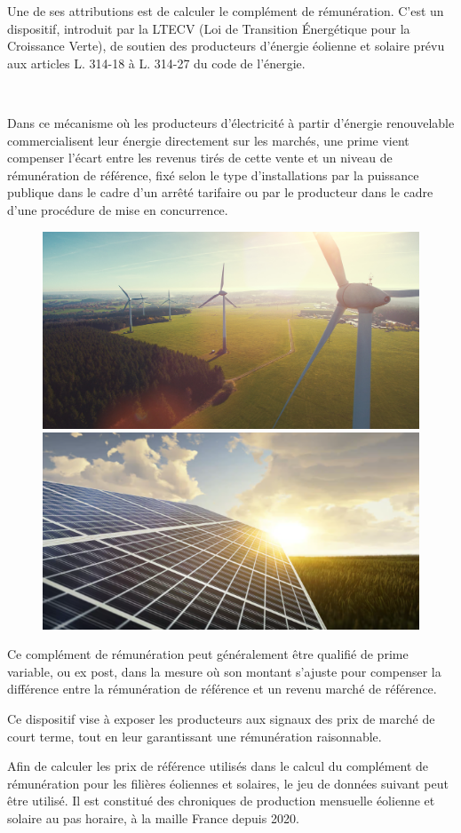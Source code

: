 Une de ses attributions est de calculer le complément de rémunération. C'est un dispositif, introduit par la LTECV (Loi de Transition Énergétique pour la Croissance Verte), de soutien des producteurs d’énergie éolienne et solaire prévu aux articles L. 314-18 à L. 314-27 du code de l’énergie.

~\

Dans ce mécanisme où les producteurs d’électricité à partir d’énergie renouvelable commercialisent leur énergie directement sur les marchés, une prime vient compenser l’écart entre les revenus tirés de cette vente et un niveau de rémunération de référence, fixé selon le type d’installations par la puissance publique dans le cadre d’un arrêté tarifaire ou par le producteur dans le cadre d’une procédure de mise en concurrence.

\begin{figure}[!ht]
\centering
\includegraphics[width=0.45\linewidth]{img/eolienne}\hfill
\includegraphics[width=0.45\linewidth]{img/solaire}
\end{figure}
Ce complément de rémunération peut généralement être qualifié de prime variable, ou ex post, dans la mesure où son montant s’ajuste pour compenser la différence entre la rémunération de référence et un revenu marché de référence.

Ce dispositif vise à exposer les producteurs aux signaux des prix de marché de court terme, tout en leur garantissant une rémunération raisonnable.

Afin de calculer les prix de référence utilisés dans le calcul du complément de rémunération pour les filières éoliennes et solaires, le jeu de données suivant peut être utilisé. Il est constitué des chroniques de production mensuelle éolienne et solaire au pas horaire, à la maille France depuis 2020.

~\

